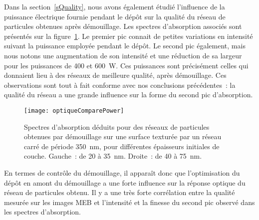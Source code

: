 Dans la section~\ref{sQuality}, nous avons également étudié l'influence de la puissance électrique fournie pendant le dépôt sur la qualité du réseau de particules obtenues après démouillage. Les spectres d'absorption associés sont présentés sur la figure~\ref{optiqueComparePower}. Le premier pic connait de petites variations en intensité suivant la puissance employée pendant le dépôt. Le second pic également, mais nous notons une augmentation de son intensité et une réduction de sa largeur pour les puissances de 400 et 600~W. Ces puissances sont précisément celles qui donnaient lieu à des réseaux de meilleure qualité, après démouillage. Ces observations sont tout à fait conforme avec nos conclusions précédentes~: la qualité du réseau a une grande influence sur la forme du second pic d'absorption.\par  
\begin{figure}[!htb]
\centering
\texttt{[image: optiqueComparePower]}
\caption{Spectres d’absorption déduits pour des réseaux de particules obtenues par démouillage sur une surface texturée par un réseau carré de période 350~nm, pour différentes épaisseurs initiales de couche. Gauche~: de 20 à 35~nm. Droite~: de 40 à 75~nm.}
\label{optiqueComparePower}
\end{figure}
En termes de contrôle du démouillage, il apparaît donc que l'optimisation du dépôt en amont du démouillage a une forte influence sur la réponse optique du réseau de particules obtenu. Il y a une très forte corrélation entre la qualité mesurée sur les images MEB et l'intensité et la finesse du second pic observé dans les spectres d'absorption.\par 
